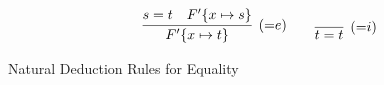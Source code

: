 \begin{table}[hbt]
	\begin{gather*}
	\infer[({=}e)]{F'\{x\mapsto t\}}{s=t & F'\{x\mapsto s\}}
	\qquad
	\infer[({=}i)]{t=t}{}
	\end{gather*}
	\caption{Natural Deduction Rules for Equality}\label{tab:natural:deduction:equality}
\end{table}
